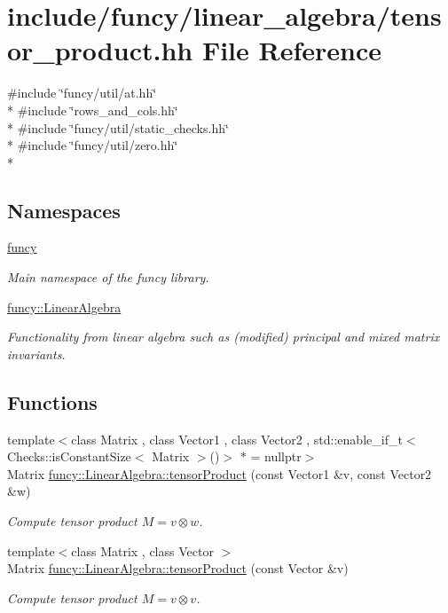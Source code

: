 \hypertarget{tensor__product_8hh}{\section{include/funcy/linear\-\_\-algebra/tensor\-\_\-product.hh File Reference}
\label{tensor__product_8hh}
}
{\ttfamily \#include \char`\"{}funcy/util/at.\-hh\char`\"{}}\\*
{\ttfamily \#include \char`\"{}rows\-\_\-and\-\_\-cols.\-hh\char`\"{}}\\*
{\ttfamily \#include \char`\"{}funcy/util/static\-\_\-checks.\-hh\char`\"{}}\\*
{\ttfamily \#include \char`\"{}funcy/util/zero.\-hh\char`\"{}}\\*
\subsection*{Namespaces}
\begin{DoxyCompactItemize}
\item 
\hyperlink{namespacefuncy}{funcy}
\begin{DoxyCompactList}\small\item\em Main namespace of the funcy library. \end{DoxyCompactList}\item 
\hyperlink{namespacefuncy_1_1LinearAlgebra}{funcy\-::\-Linear\-Algebra}
\begin{DoxyCompactList}\small\item\em Functionality from linear algebra such as (modified) principal and mixed matrix invariants. \end{DoxyCompactList}\end{DoxyCompactItemize}
\subsection*{Functions}
\begin{DoxyCompactItemize}
\item 
{\footnotesize template$<$class Matrix , class Vector1 , class Vector2 , std\-::enable\-\_\-if\-\_\-t$<$ Checks\-::is\-Constant\-Size$<$ Matrix $>$()$>$ $\ast$  = nullptr$>$ }\\Matrix \hyperlink{group__LinearAlgebraGroup_gabbd540f49b8005cfed789e216443744d}{funcy\-::\-Linear\-Algebra\-::tensor\-Product} (const Vector1 \&v, const Vector2 \&w)
\begin{DoxyCompactList}\small\item\em Compute tensor product $ M = v \otimes w $. \end{DoxyCompactList}\item 
{\footnotesize template$<$class Matrix , class Vector $>$ }\\Matrix \hyperlink{group__LinearAlgebraGroup_gaf2bb42fe59352ef2090cb2907890e1d5}{funcy\-::\-Linear\-Algebra\-::tensor\-Product} (const Vector \&v)
\begin{DoxyCompactList}\small\item\em Compute tensor product $ M = v \otimes v $. \end{DoxyCompactList}\end{DoxyCompactItemize}

